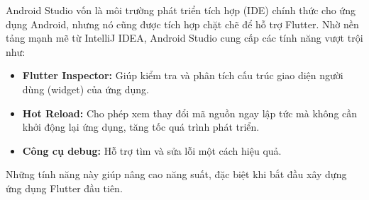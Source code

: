 \documentclass[../DoAn.tex]{subfiles}
\numberwithin{figure}{chapter}
\begin{document}
Android Studio vốn là môi trường phát triển tích hợp (IDE) chính thức cho ứng dụng Android, nhưng nó cũng được tích hợp chặt chẽ để hỗ trợ Flutter. Nhờ nền tảng mạnh mẽ từ IntelliJ IDEA, Android Studio cung cấp các tính năng vượt trội như:
\begin{itemize}
    \item \textbf{Flutter Inspector: } Giúp kiểm tra và phân tích cấu trúc giao diện người dùng (widget) của ứng dụng.
    \item \textbf{Hot Reload: } Cho phép xem thay đổi mã nguồn ngay lập tức mà không cần khởi động lại ứng dụng, tăng tốc quá trình phát triển.
    \item \textbf{Công cụ debug: } Hỗ trợ tìm và sửa lỗi một cách hiệu quả.
\end{itemize}

Những tính năng này giúp nâng cao năng suất, đặc biệt khi bắt đầu xây dựng ứng dụng Flutter đầu tiên.
\end{document}
